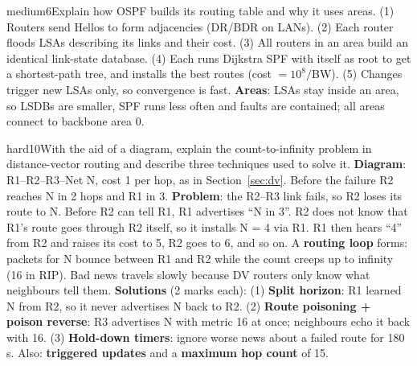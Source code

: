 \documentclass[10pt]{article}
\begin{document}
\begin{practice}{medium}{6}Explain how OSPF builds its routing table and why it uses areas.
\sol (1) Routers send Hellos to form adjacencies (DR/BDR on LANs). (2) Each router floods LSAs describing its links and their cost. (3) All routers in an area build an identical link-state database. (4) Each runs Dijkstra SPF with itself as root to get a shortest-path tree, and installs the best routes (cost $= 10^8/$BW). (5) Changes trigger new LSAs only, so convergence is fast. \textbf{Areas}: LSAs stay inside an area, so LSDBs are smaller, SPF runs less often and faults are contained; all areas connect to backbone area 0.
\end{practice}

\begin{practice}{hard}{10}With the aid of a diagram, explain the count-to-infinity problem in distance-vector routing and describe three techniques used to solve it.
\sol \textbf{Diagram}: R1--R2--R3--Net N, cost 1 per hop, as in Section~\ref{sec:dv}. Before the failure R2 reaches N in 2 hops and R1 in 3.
\textbf{Problem}: the R2--R3 link fails, so R2 loses its route to N. Before R2 can tell R1, R1 advertises ``N in 3''. R2 does not know that R1's route goes through R2 itself, so it installs N = 4 via R1. R1 then hears ``4'' from R2 and raises its cost to 5, R2 goes to 6, and so on. A \textbf{routing loop} forms: packets for N bounce between R1 and R2 while the count creeps up to infinity (16 in RIP). Bad news travels slowly because DV routers only know what neighbours tell them.
\textbf{Solutions} (2 marks each):
(1) \textbf{Split horizon}: R1 learned N from R2, so it never advertises N back to R2.
(2) \textbf{Route poisoning + poison reverse}: R3 advertises N with metric 16 at once; neighbours echo it back with 16.
(3) \textbf{Hold-down timers}: ignore worse news about a failed route for 180 s.
Also: \textbf{triggered updates} and a \textbf{maximum hop count} of 15.
\end{practice}
\end{document}
